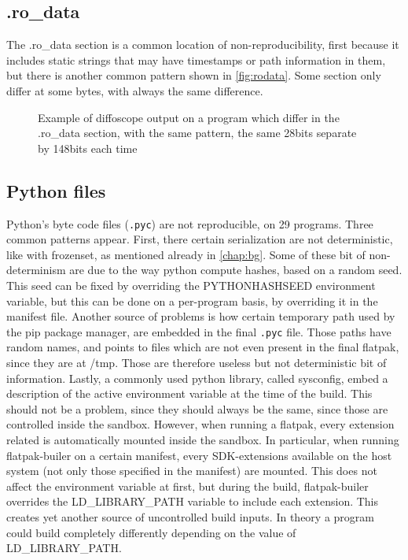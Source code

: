 \documentclass[a4paper,11pt,oneside]{report}
\theoremstyle{definition}
\newcommand{\fp}{flatpak\xspace}
\newcommand{\fb}{flatpak-builer\xspace}
\newcommand{\ldlp}{LD\_LIBRARY\_PATH\xspace}
\newcommand{\dfc}{diffoscope\xspace}
\begin{document}
\subsection*{.ro\_data}
The .ro\_data section is a common location of non-reproducibility, first
because it includes static strings that may have timestamps or path information
in them, but there is another common pattern shown in \autoref{fig:rodata}.
Some section only differ at some bytes, with always the same difference.
\begin{figure}[h]
    \caption{Example of \dfc output on a program which differ in the .ro\_data
    section, with the same pattern, the same 28bits separate by 148bits each
    time}
    \label{fig:rodata}
\end{figure}

\subsection*{Python files}
Python's byte code files (\verb|.pyc|) are not reproducible, on 29 programs.
Three common patterns appear. First, there certain serialization are not
deterministic, like with frozenset, as mentioned already in \autoref{chap:bg}.
Some of these bit of non-determinism are due to the way python compute hashes,
based on a random seed. This seed can be fixed by overriding the PYTHONHASHSEED
environment variable, but this can be done on a per-program basis, by
overriding it in the manifest file. Another source of problems is how certain
temporary path used by the pip package manager, are embedded in the final
\verb|.pyc| file. Those paths have random names, and points to files which are
not even present in the final \fp, since they are at /tmp. Those are therefore
useless but not deterministic bit of information.
Lastly, a commonly used python library, called sysconfig, embed a description
of the active environment variable at the time of the build. This should not be
a problem, since they should always be the same, since those are controlled
inside the sandbox. However, when running a \fp, every extension related is
automatically mounted inside the sandbox. In particular, when running \fb on a
certain manifest, every SDK-extensions available on the host system (not only
those specified in the manifest) are mounted. This does not affect the
environment variable at first, but during the build, \fb overrides the
\ldlp variable to include each extension. This creates yet another
source of uncontrolled build inputs. In theory a program could build completely
differently depending on the value of \ldlp.
\end{document}
